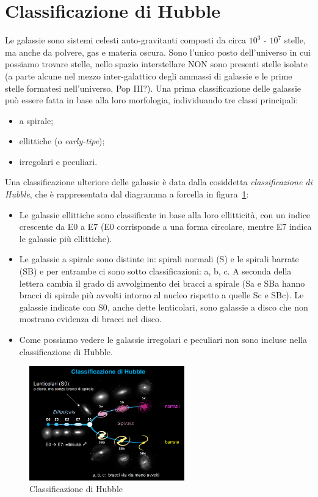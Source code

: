 \section{Classificazione di Hubble}\label{sec:classificazione-di-hubble}
Le galassie sono sistemi celesti auto-gravitanti composti da circa $10^3$ - $10^7$ stelle, ma anche da polvere, gas e materia oscura. Sono l'unico posto dell'universo in cui possiamo trovare stelle, nello spazio interstellare NON sono presenti stelle isolate (a parte alcune nel mezzo inter-galattico degli ammassi di galassie e le prime stelle formatesi nell’universo, Pop III?).
Una prima classificazione delle galassie può essere fatta in base alla loro morfologia, individuando tre classi principali:
\begin{itemize}
	\item a spirale;
	\item ellittiche (o \textit{early-tipe});
	\item irregolari e peculiari.
\end{itemize}

Una classificazione ulteriore delle galassie è data dalla cosiddetta \emph{classificazione di Hubble}, che è rappresentata
dal diagramma a forcella in figura~\ref{fig:classificazione-di-hubble}:
\begin{itemize}
	\item Le galassie ellittiche sono classificate in base alla loro ellitticità, con un indice crescente da E0 a E7 (E0 corrisponde a una forma circolare, mentre E7 indica le galassie più ellittiche).
	\item Le galassie a spirale sono distinte in: spirali normali (S) e le spirali barrate (SB) e per entrambe ci sono sotto classificazioni: a, b, c. A seconda della lettera cambia il grado di avvolgimento dei bracci a spirale (Sa e SBa hanno bracci di spirale più avvolti intorno al nucleo rispetto a quelle Sc e SBc). Le galassie indicate con S0, anche dette lenticolari, sono galassie a disco che non mostrano evidenza di bracci nel disco.
	\item Come possiamo vedere le galassie irregolari e peculiari non sono incluse nella classificazione di Hubble.
\end{itemize}

\begin{figure}
	\centering
	\includegraphics[width=0.6\textwidth]{immagini/classificazione-di-hubble.png}
	\caption{Classificazione di Hubble}
	\label{fig:classificazione-di-hubble}
\end{figure}

